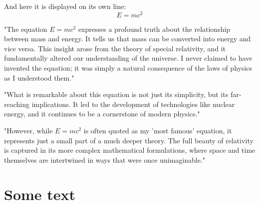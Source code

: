 And here it is displayed on its own line:
\[
E = mc^2
\]

"The equation $E = mc^2$ expresses a profound truth about the relationship between mass and energy. It tells us that mass can be converted into energy and vice versa. This insight arose from the theory of special relativity, and it fundamentally altered our understanding of the universe. I never claimed to have invented the equation; it was simply a natural consequence of the laws of physics as I understood them."

"What is remarkable about this equation is not just its simplicity, but its far-reaching implications. It led to the development of technologies like nuclear energy, and it continues to be a cornerstone of modern physics."

"However, while $E = mc^2$ is often quoted as my 'most famous' equation, it represents just a small part of a much deeper theory. The full beauty of relativity is captured in its more complex mathematical formulations, where space and time themselves are intertwined in ways that were once unimaginable."

\section{Some text}
